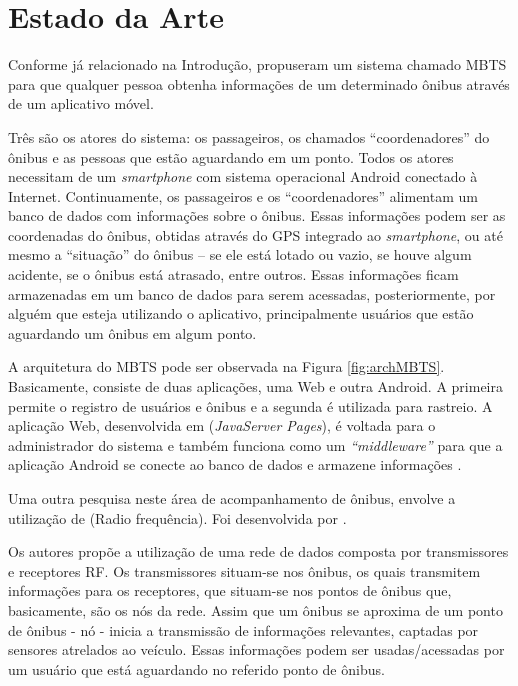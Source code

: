 \section{Estado da Arte}

Conforme já relacionado na Introdução,  propuseram um sistema chamado MBTS para que qualquer pessoa obtenha informações de um determinado ônibus através de um aplicativo móvel. 

Três são os atores do sistema: os passageiros, os chamados ``coordenadores'' do ônibus e as pessoas que estão aguardando em um ponto. Todos os atores necessitam de um \textit{smartphone} com sistema operacional Android conectado à Internet. Continuamente, os passageiros e os ``coordenadores'' alimentam um banco de dados com informações sobre o ônibus. Essas informações podem ser as coordenadas do ônibus, obtidas através do GPS integrado ao \emph{smartphone}, ou até mesmo a ``situação'' do ônibus -- se ele está lotado ou vazio, se houve algum acidente, se o ônibus está atrasado, entre outros. Essas informações ficam armazenadas em um banco de dados para serem acessadas, posteriormente, por alguém que esteja utilizando o aplicativo, principalmente usuários que estão aguardando um ônibus em algum ponto. 

A arquitetura do MBTS pode ser observada na Figura \ref{fig:archMBTS}. Basicamente, consiste de duas aplicações, uma Web e outra Android. A primeira permite o registro de usuários e ônibus e a segunda é utilizada para rastreio. A aplicação Web, desenvolvida em  (\textit{JavaServer Pages}), é voltada para o administrador do sistema e também funciona como um \textit{``middleware''} para que a aplicação Android se conecte ao banco de dados e armazene informações \cite{sujatha}.

Uma outra pesquisa neste área de acompanhamento de ônibus, envolve a utilização de  (Radio frequência). Foi desenvolvida por .

Os autores propõe a utilização de uma rede de dados composta por transmissores e receptores RF. Os transmissores situam-se nos ônibus, os quais transmitem informações para os receptores, que situam-se nos pontos de ônibus que, basicamente, são os nós da rede. Assim que um ônibus se aproxima de um ponto de ônibus - nó - inicia a transmissão de informações relevantes, captadas por sensores atrelados ao veículo. Essas informações podem ser usadas/acessadas por um usuário que está aguardando no referido ponto de ônibus. 

